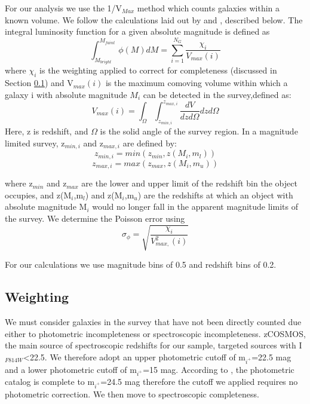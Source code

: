 \documentclass[manuscript]{aastex61}
\begin{document}
For our analysis we use the 1/V$_{Max}$ method \citep{1968ApJ...151..393S} which counts galaxies within a known volume. We follow the calculations laid out by \citet{2006ApJ...647..853W} and \citet{2005A&A...439..863I}, described below. The integral luminosity function for a given absolute magnitude is defined as 
\begin{equation}
\int_{M_{bright}}^{M_{faint}}\phi(M)dM=\sum_{i=1}^{N_{G}}\frac{\chi_{i}}{V_{max}(i)}
\label{eq:equation 7}
\end{equation}
where $\chi_{i}$ is the weighting applied to correct for completeness (discussed in Section \ref{sec:Weighting}) and V$_{max}(i)$ is the maximum comoving volume within which a galaxy i with absolute magnitude $M_{i}$ can be detected in the survey,defined as:
\begin{equation}
V_{max}(i)=\int_{\Omega}\int_{z_{min,i}}^{z_{max,i}}\frac{dV}{dz d\Omega}dz d\Omega
\label{eq:equation 8}
\end{equation}
Here, z is redshift, and $\Omega$ is the solid angle of the survey region. In a magnitude limited survey, z$_{min,i}$ and z$_{max,i}$ are defined by:
\begin{equation}
z_{min,i}=min(z_{min},z(M_{i},m_{l}))
\label{eq:equation 9}
\end{equation}
\begin{equation}
z_{max,i}=max(z_{max},z(M_{i},m_{u}))
\label{eq:equation 10}
\end{equation}

where z$_{min}$ and z$_{max}$ are the lower and upper limit of the redshift bin the object occupies, and z(M$_{i}$,m$_{l}$) and z(M$_{i}$,m$_{u}$) are the redshifts at which an object with absolute magnitude M$_{i}$ would no longer fall in the apparent magnitude limits of the survey. We determine the Poisson error using 
\begin{equation}
\sigma_{\phi}=\sqrt{\frac{\chi_{i}}{V_{max,}^{2}(i)}}
\label{eq:equation 11}
\end{equation}

For our calculations we use magnitude bins of 0.5 and redshift bins of 0.2. 
\subsection{Weighting}\label{sec:Weighting}
We must consider galaxies in the survey that have not been directly counted due either to photometric incompleteness or spectroscopic incompleteness. zCOSMOS, the main source of spectroscopic redshifts for our sample, targeted sources with I$_{F814W}$<22.5. We therefore adopt an upper photometric cutoff of m$_{i^{+}}$=22.5 mag and a lower photometric cutoff of m$_{i^{+}}$=15 mag. According to \citet{2017MNRAS.464.1569A}, the photometric catalog is complete to m$_{i^{+}}$=24.5 mag therefore the cutoff we applied requires no photometric correction. We then move to spectroscopic completeness. 
\end{document}
